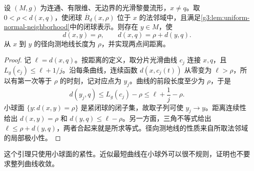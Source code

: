 \begin{lemma}\label{g3:lem:first-sphere-distance-equality}
	设 \((M,g)\) 为连通、有限维、无边界的光滑黎曼流形，\(x\ne q\)。取 \(0<\rho<d(x,q)\)，使闭球 \(\overline B_d(x,\rho)\) 位于 \(x\) 的法邻域中，且满足\cref{g3:lem:uniform-normal-neighborhood}中的闭球表示。则存在 \(y\in M\)，使
	\begin{equation}\label{g3:eq:first-sphere-distance-equality}
		d(x,y)=\rho,\qquad d(x,q)=\rho+d(y,q).
	\end{equation}
	从 \(x\) 到 \(y\) 的径向测地线长度为 \(\rho\)，并实现两点间距离。
\end{lemma}
\begin{proof}
	记 \(\ell=d(x,q)\)。按距离的定义，取分片光滑曲线 \(c_j\) 连接 \(x,q\)，且 \(L_g(c_j)\le\ell+1/j\)。沿每条曲线，连续函数 \(d(x,c_j(t))\) 从零变为 \(\ell>\rho\)，所以有第一次等于 \(\rho\) 的时刻，记对应点为 \(y_j\)。曲线的前段长度至少为 \(\rho\)，于是
	\[
		d(y_j,q)\le L_g(c_j)-\rho\le\ell+\frac1j-\rho.
	\]
	小球面 \(\{y:d(x,y)=\rho\}\) 是紧闭球的闭子集，故取子列可使 \(y_j\rightarrow y\)。距离连续性给出 \(d(x,y)=\rho\) 和 \(d(y,q)\le\ell-\rho\)。另一方面，三角不等式给出 \(\ell\le\rho+d(y,q)\)，两者合起来就是所求等式。径向测地线的性质来自所取法邻域的局部极小性。
\end{proof}

这个引理只使用小球面的紧性。近似最短曲线在小球外可以很不规则，证明也不要求整列曲线收敛。

